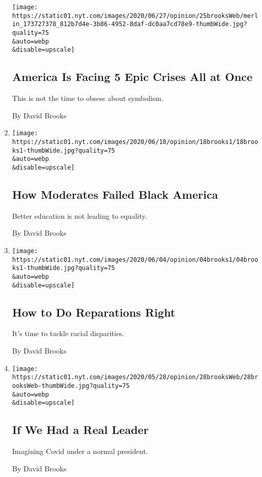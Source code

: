 \begin{enumerate}
  \texttt{[image: https://static01.nyt.com/images/2020/06/27/opinion/25brooksWeb/merlin\_173727378\_812b7d4e-3b86-4952-8daf-dc0aa7cd78e9-thumbWide.jpg?quality=75\\\&auto=webp\\\&disable=upscale]}

  \hypertarget{america-is-facing-5-epic-crises-all-at-once}{%
  \subsection{America Is Facing 5 Epic Crises All at
  Once}\label{america-is-facing-5-epic-crises-all-at-once}}

  This is not the time to obsess about symbolism.

  By David Brooks
\item
  \href{/2020/06/18/opinion/black-america-education.html}{}

  \texttt{[image: https://static01.nyt.com/images/2020/06/18/opinion/18brooks1/18brooks1-thumbWide.jpg?quality=75\\\&auto=webp\\\&disable=upscale]}

  \hypertarget{how-moderates-failed-black-america}{%
  \subsection{How Moderates Failed Black
  America}\label{how-moderates-failed-black-america}}

  Better education is not leading to equality.

  By David Brooks
\item
  \href{/2020/06/04/opinion/united-states-reparations.html}{}

  \texttt{[image: https://static01.nyt.com/images/2020/06/04/opinion/04brooks1/04brooks1-thumbWide.jpg?quality=75\\\&auto=webp\\\&disable=upscale]}

  \hypertarget{how-to-do-reparations-right}{%
  \subsection{How to Do Reparations
  Right}\label{how-to-do-reparations-right}}

  It's time to tackle racial disparities.

  By David Brooks
\item
  \href{/2020/05/28/opinion/coronavirus-trump.html}{}

  \texttt{[image: https://static01.nyt.com/images/2020/05/28/opinion/28brooksWeb/28brooksWeb-thumbWide.jpg?quality=75\\\&auto=webp\\\&disable=upscale]}

  \hypertarget{if-we-had-a-real-leader}{%
  \subsection{If We Had a Real Leader}\label{if-we-had-a-real-leader}}

  Imagining Covid under a normal president.

  By David Brooks
\end{enumerate}

